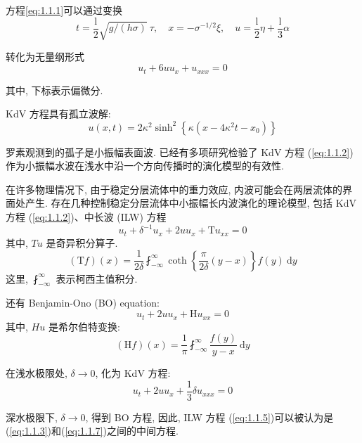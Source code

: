 \documentclass[14pt,a4paper,oneside]{article}
\numberwithin{equation}{subsection}             %
\begin{document}
方程\ref{eq:1.1.1}可以通过变换
\begin{equation}
    t=\frac{\mathrm{l}}2\sqrt{g/(h\sigma)}\:\tau,\quad x=-\sigma^{-1/2}\xi,\quad u=\frac{\mathrm{l}}2\eta+\frac{\mathrm{l}}3\alpha 
    \label{eq:1.1.2}
\end{equation}

转化为无量纲形式
\begin{equation}
    u_t+6uu_x+u_{xxx}=0
    \label{eq:1.1.3}
\end{equation}

其中, 下标表示偏微分.

KdV 方程具有孤立波解:
\begin{equation}
    u(x,t)=2\kappa^2\sinh^2\left\{\kappa(x-4\kappa^2t-x_0)\right\}
    \label{eq:1.1.4}
\end{equation}

罗素观测到的孤子是小振幅表面波. 已经有多项研究检验了 KdV 方程 (\ref{eq:1.1.2}) 作为小振幅水波在浅水中沿一个方向传播时的演化模型的有效性.

在许多物理情况下, 由于稳定​​分层流体中的重力效应, 内波可能会在两层流体的界面处产生. 存在几种控制稳定分层流体中小振幅长内波演化的理论模型, 包括 KdV 方程 (\ref{eq:1.1.2})、中长波 (ILW) 方程
\begin{equation}
    u_t+\delta^{-1}u_x+2uu_x+\mathrm{T}u_{xx}=0
    \label{eq:1.1.5}
\end{equation}
其中, $Tu$ 是奇异积分算子.
\begin{equation}
    (\text{T}f)(x)=\frac1{2\delta}\fint_{-\infty}^\infty\coth\left\{\frac\pi{2\delta}(y-x)\right\}f(y)\:\mathrm{d}y
    \label{eq:1.1.6}
\end{equation}
这里, $\fint_{-\infty}^\infty$ 表示柯西主值积分.

还有 Benjamin-Ono (BO) equation:
\begin{equation}
    u_t+2uu_x+\text{H}u_{xx}=0
    \label{eq:1.1.7}
\end{equation}
其中, $Hu$ 是希尔伯特变换:
\begin{equation}
    (\text{H}f)(x)=\frac1\pi\fint_{-\infty}^\infty\frac{f(y)}{y-x}\mathrm{~d}y
    \label{eq:1.1.8}
\end{equation}

在浅水极限处, $\delta \rightarrow 0$, 化为 KdV 方程:
\begin{equation}
    u_t+2uu_x+\frac13\delta u_{xxx}=0
    \label{eq:1.1.9}
\end{equation}

深水极限下, $\delta \rightarrow 0$, 得到 BO 方程, 因此, ILW 方程 (\ref{eq:1.1.5})可以被认为是(\ref{eq:1.1.3})和(\ref{eq:1.1.7})之间的中间方程.
\end{document}
